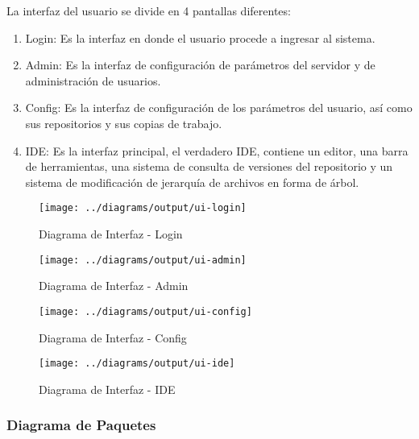 La interfaz del usuario se divide en 4 pantallas diferentes:

\begin{enumerate}

	\item Login: Es la interfaz en donde el usuario procede a ingresar al sistema.
	
	\item Admin: Es la interfaz de configuración de parámetros del servidor y de administración de usuarios.
	
	\item Config: Es la interfaz de configuración de los parámetros del usuario, así como sus repositorios y sus copias de trabajo.
	
	\item IDE: Es la interfaz principal, el verdadero IDE, contiene un editor, una barra de herramientas, una sistema de consulta de versiones del repositorio y un sistema de modificación de jerarquía de archivos en forma de árbol.

\end{enumerate}

\begin{landscape}
\begin{figure}
 \centering
 \texttt{[image: ../diagrams/output/ui-login]}
 \caption{Diagrama de Interfaz - Login}
 \label{diagrama:ui-login}
\end{figure}
\end{landscape}

\begin{figure}
 \centering
 \texttt{[image: ../diagrams/output/ui-admin]}
 \caption{Diagrama de Interfaz - Admin}
 \label{diagrama:ui-admin}
\end{figure}

\begin{figure}
 \centering
 \texttt{[image: ../diagrams/output/ui-config]}
 \caption{Diagrama de Interfaz - Config}
 \label{diagrama:ui-config}
\end{figure}

\begin{landscape}
\begin{figure}
 \centering
 \texttt{[image: ../diagrams/output/ui-ide]}
 \caption{Diagrama de Interfaz - IDE}
 \label{diagrama:ui-ide}
\end{figure}
\end{landscape}


\subsubsection{Diagrama de Paquetes}

